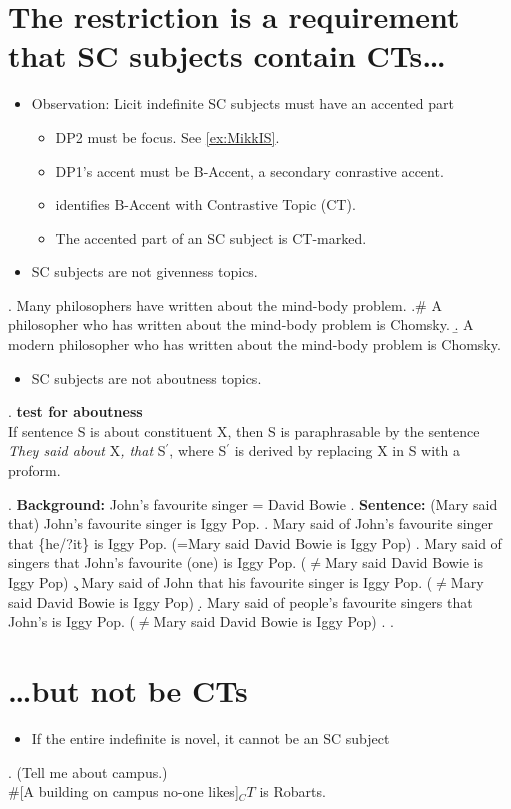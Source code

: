 \documentclass[GPFinal]{subfiles}
\begin{document}
\section{The restriction is a requirement that SC subjects contain CTs\ldots}
\begin{itemize}
  \item Observation: Licit indefinite SC subjects must have an accented part
    \begin{itemize}
      \item DP2 must be focus. See \ref{ex:MikkIS}.
      \item DP1's accent must be  B-Accent, a secondary conrastive accent.
      \item \textcite{buring2003d} identifies B-Accent with Contrastive Topic (CT).
      \item The accented part of an SC subject is CT-marked.
    \end{itemize}
  \item SC subjects are not givenness topics.
\end{itemize}
\ex. Many philosophers have written about the mind-body problem.
\a.\# A philosopher who has written about the mind-body problem is Chomsky.
\b. A modern philosopher who has written about the mind-body problem is Chomsky.

\begin{itemize}
  \item SC subjects are not aboutness topics.
\end{itemize}
\ex. \textbf{ test for aboutness}\\
If sentence S is about constituent X, then S is paraphrasable by the sentence \textit{They said about }X\textit{, that }S$^\prime$, where S$^\prime$ is derived by replacing X in S with a proform.

\ex. \textbf{Background:} John's favourite singer = David Bowie
\a. \textbf{Sentence:}  (Mary said that) John's favourite singer is Iggy Pop.
\a. Mary said of John's favourite singer that \{he/?it\} is Iggy Pop. (=Mary said David Bowie is Iggy Pop)
\a. Mary said of singers that John's favourite (one) is Iggy Pop. ($\neq$Mary said David Bowie is Iggy Pop)
\c. Mary said of John that his favourite singer is Iggy Pop. ($\neq$Mary said David Bowie is Iggy Pop)
\d. Mary said of people's favourite singers that John's is Iggy Pop. ($\neq$Mary said David Bowie is Iggy Pop)
\z.
\z.

\section{\ldots but not be CTs}
\begin{itemize}
  \item If the entire indefinite is novel, it cannot be an SC subject
\end{itemize}
\ex. (Tell me about campus.)\\
\#[A building on campus no-one likes]$_CT$ is Robarts.
\end{document}
